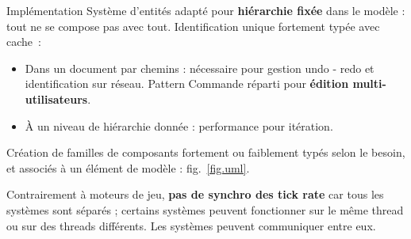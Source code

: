 \begin{block}{Implémentation}
Système d'entités adapté pour \textbf{hiérarchie fixée} dans le modèle : tout ne se compose pas avec tout.
Identification unique fortement typée avec cache~: 
\begin{itemize}
    \item Dans un document par chemins : nécessaire pour gestion undo - redo et identification sur réseau.
    Pattern Commande réparti pour \textbf{édition multi-utilisateurs}.
    \item À un niveau de hiérarchie donnée : performance pour itération.
   \end{itemize}

Création de familles de composants fortement ou faiblement typés selon le besoin, et associés à un élément de modèle : fig.~\ref{fig.uml}.

Contrairement à moteurs de jeu, \textbf{pas de synchro des tick rate} car tous les systèmes sont séparés ; certains systèmes peuvent fonctionner sur le même thread ou sur des threads différents. 
Les systèmes peuvent communiquer entre eux.
\end{block}